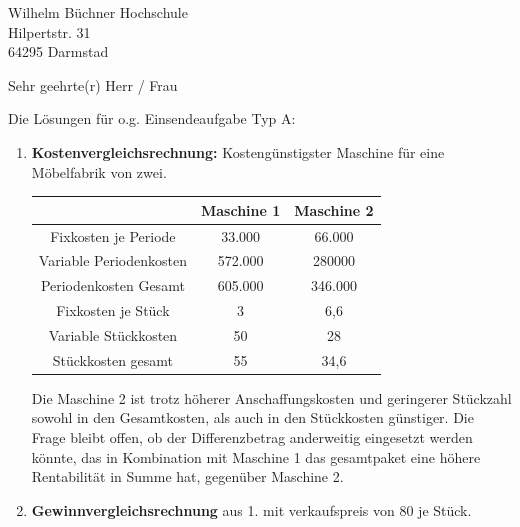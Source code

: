 \documentclass[
    version=last,           %
    DIV=13,                 %
    BCOR=0mm,               %
    paper=a4,               %
    fontsize=12pt,          %
    firsthead=on,           %
    firstfoot=on,           %
    pagenumber=on,i         %
    parskip=half,           %
    enlargefirstpage=,      %
    firsthead=on,           %
    fromrule=afteraddress,  %
    priority=off,           %
    backaddress=true,       %
    refline=dateright,      %
	fromalign=right,	    %
    fromemail=on,i          %
    fromurl=on,             %
    frombank=on,
    fromphone=on,           %
    frommobilephone=on      %
    fromlogo=on,            %
    addrfield=on,           %
    subject=untitled,  %
    foldmarks=off,          %
    numericaldate=off,      %
	pagenumber=right,	        %
	parskip=half,	        %
    headsep=false,          %
    footsepline=true,       %
    foldmarks=off,		    %
	]{scrlttr2}
\begin{document}

\begin{letter} {Wilhelm Büchner Hochschule \\
Hilpertstr. 31\\
64295 Darmstad}



\opening{Sehr geehrte(r) Herr / Frau}
Die Lösungen für o.g. Einsendeaufgabe Typ A:


\begin{enumerate}
    \item \textbf{Kostenvergleichsrechnung:} Kostengünstigster Maschine für eine Möbelfabrik von zwei.

\begin{tabular}{| c | c | c | }
\hline & \textbf{Maschine 1} & \textbf{Maschine 2} \\
\hline Fixkosten je Periode & 33.000 & 66.000 \\
\hline Variable Periodenkosten & 572.000 & 280000 \\
\hline Periodenkosten Gesamt & 605.000 & 346.000 \\
\hline Fixkosten je Stück & 3 & 6,6 \\
\hline Variable Stückkosten & 50 & 28 \\
\hline Stückkosten gesamt & 55 & 34,6 \\
\hline
\end{tabular}

Die Maschine 2 ist trotz höherer Anschaffungskosten und geringerer Stückzahl
sowohl in den Gesamtkosten, als auch in den Stückkosten günstiger.
Die Frage bleibt offen, ob der Differenzbetrag anderweitig eingesetzt werden
könnte, das in Kombination mit Maschine 1 das gesamtpaket eine höhere
Rentabilität in Summe hat, gegenüber Maschine 2.
\item \textbf{Gewinnvergleichsrechnung} aus 1. mit verkaufspreis von 80 je
    Stück.


\end{enumerate}
\end{letter}
\end{document}
